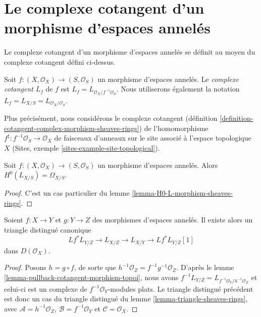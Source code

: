 \section{Le complexe cotangent d'un morphisme d'espaces annelés}
\label{section-cotangent-morphism-ringed-spaces}

\noindent
Le complexe cotangent d'un morphisme d'espaces annelés se définit au moyen du
complexe cotangent défini ci-dessus.

\begin{definition}
\label{definition-cotangent-complex-morphism-ringed-spaces}
Soit $f : (X, \mathcal{O}_X) \to (S, \mathcal{O}_S)$ un morphisme d'espaces
annelés. Le {\it complexe cotangent} $L_f$ de $f$ est
$L_f = L_{\mathcal{O}_X/f^{-1}\mathcal{O}_S}$.
Nous utiliserons également la notation
$L_f = L_{X/S} = L_{\mathcal{O}_X/\mathcal{O}_S}$.
\end{definition}

\noindent
Plus précisément, nous considérons le complexe cotangent (définition
\ref{definition-cotangent-complex-morphism-sheaves-rings}) de l'homomorphisme
$f^\sharp : f^{-1}\mathcal{O}_S \to \mathcal{O}_X$ de faisceaux d'anneaux sur
le site associé à l'espace topologique $X$ (Sites, exemple
\ref{sites-example-site-topological}).

\begin{lemma}
\label{lemma-H0-L-morphism-ringed-spaces}
Soit $f : (X, \mathcal{O}_X) \to (S, \mathcal{O}_S)$ un morphisme d'espaces
annelés. Alors $H^0(L_{X/S}) = \Omega_{X/S}$.
\end{lemma}

\begin{proof}
C'est un cas particulier du lemme \ref{lemma-H0-L-morphism-sheaves-rings}.
\end{proof}

\begin{lemma}
\label{lemma-triangle-ringed-spaces}
Soient $f : X \to Y$ et $g : Y \to Z$ des morphismes d'espaces annelés. Il
existe alors un triangle distingué canonique
$$
Lf^* L_{Y/Z} \to L_{X/Z} \to L_{X/Y} \to Lf^*L_{Y/Z}[1]
$$
dans $D(\mathcal{O}_X)$.
\end{lemma}

\begin{proof}
Posons $h = g \circ f$, de sorte que
$h^{-1}\mathcal{O}_Z = f^{-1}g^{-1}\mathcal{O}_Z$. D'après le lemme
\ref{lemma-pullback-cotangent-morphism-topoi}, nous avons
$f^{-1}L_{Y/Z} = L_{f^{-1}\mathcal{O}_Y/h^{-1}\mathcal{O}_Z}$
et celui-ci est un complexe de $f^{-1}\mathcal{O}_Y$-modules plats. Le triangle
distingué précédent est donc un cas du triangle distingué du lemme
\ref{lemma-triangle-sheaves-rings}, avec
$\mathcal{A} = h^{-1}\mathcal{O}_Z$, $\mathcal{B} = f^{-1}\mathcal{O}_Y$ et
$\mathcal{C} = \mathcal{O}_X$.
\end{proof}

